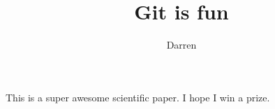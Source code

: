 \documentclass[10pt]{article}
\author{Darren}
\title{Git is fun}
\begin{document}
		\maketitle

		This is a super awesome scientific paper.
		I hope I win a prize.
\end{document}
